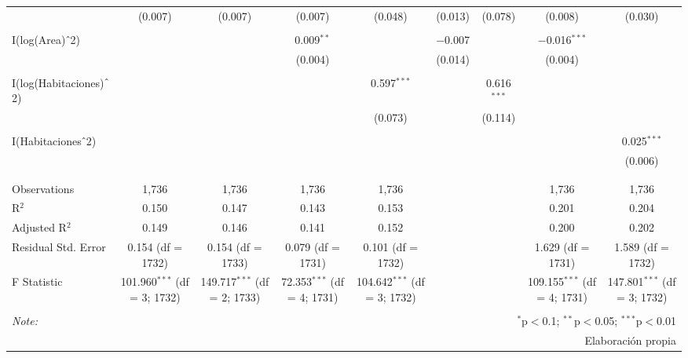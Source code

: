 \documentclass[12pt,a4paper]{article}
\begin{document}
\begin{table}[H]
{\begin{tabular}{@{\extracolsep{5pt}}lcccccccc}
		& (0.007) & (0.007) & (0.007) & (0.048) & (0.013) & (0.078) & (0.008) & (0.030) \\ 
		& & & & & & & & \\ 
		I(log(Area)$\hat{\mkern6mu}$2) &  &  & 0.009$^{**}$ &  & $-$0.007 &  & $-$0.016$^{***}$ &  \\ 
		&  &  & (0.004) &  & (0.014) &  & (0.004) &  \\ 
		& & & & & & & & \\ 
		I(log(Habitaciones)$\hat{\mkern6mu}$2) &  &  &  & 0.597$^{***}$ &  & 0.616$^{***}$ &  &  \\ 
		&  &  &  & (0.073) &  & (0.114) &  &  \\ 
		& & & & & & & & \\ 
		I(Habitaciones$\hat{\mkern6mu}$2) &  &  &  &  &  &  &  & 0.025$^{***}$ \\ 
		&  &  &  &  &  &  &  & (0.006) \\ 
		& & & & & & & & \\ 
		\hline \\[-1.8ex] 
		Observations & 1,736 & 1,736 & 1,736 & 1,736 &  &  & 1,736 & 1,736 \\ 
		R$^{2}$ & 0.150 & 0.147 & 0.143 & 0.153 &  &  & 0.201 & 0.204 \\ 
		Adjusted R$^{2}$ & 0.149 & 0.146 & 0.141 & 0.152 &  &  & 0.200 & 0.202 \\ 
		Residual Std. Error & 0.154 (df = 1732) & 0.154 (df = 1733) & 0.079 (df = 1731) & 0.101 (df = 1732) &  &  & 1.629 (df = 1731) & 1.589 (df = 1732) \\ 
		F Statistic & 101.960$^{***}$ (df = 3; 1732) & 149.717$^{***}$ (df = 2; 1733) & 72.353$^{***}$ (df = 4; 1731) & 104.642$^{***}$ (df = 3; 1732) &  &  & 109.155$^{***}$ (df = 4; 1731) & 147.801$^{***}$ (df = 3; 1732) \\ 
		\hline 
		\hline \\[-1.8ex] 
		\textit{Note:}  & \multicolumn{8}{r}{$^{*}$p$<$0.1; $^{**}$p$<$0.05; $^{***}$p$<$0.01} \\ 
		& \multicolumn{8}{r}{Elaboración propia} \\ 
	\end{tabular} 
}
\end{table}



\newpage

     
\end{document}
